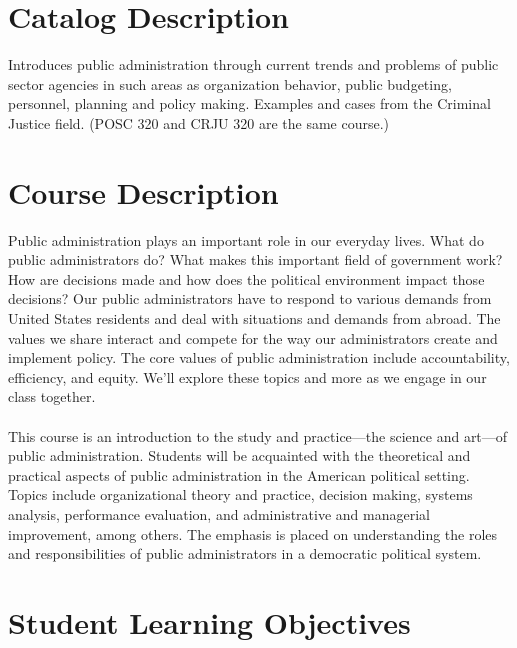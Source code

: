 \documentclass[11pt, letterpaper]{article}
\begin{document}
\section{Catalog Description}

Introduces public administration through current trends and problems of public sector agencies in such areas as organization behavior, public budgeting, personnel, planning and policy making. Examples and cases from the Criminal Justice field. (POSC 320 and CRJU 320 are the same course.)

\section{Course Description}

Public administration plays an important role in our everyday lives. What do public administrators do? What makes this important field of government work? How are decisions made and how does the political environment impact those decisions? Our public administrators have to respond to various demands from United States residents and deal with situations and demands from abroad. The values we share interact and compete for the way our administrators create and implement policy. The core values of public administration include accountability, efficiency, and equity. We'll explore these topics and more as we engage in our class together. 

\vspace*{1em}

\paragraph{} This course is an introduction to the study and practice---the science and art---of public administration. Students will be acquainted with the theoretical and practical aspects of public administration in the American political setting. Topics include organizational theory and practice, decision making, systems analysis, performance evaluation, and administrative and managerial improvement, among others. The emphasis is placed on understanding the roles and responsibilities of public administrators in a democratic political system. 
	

\section{Student Learning Objectives}
\end{document}
